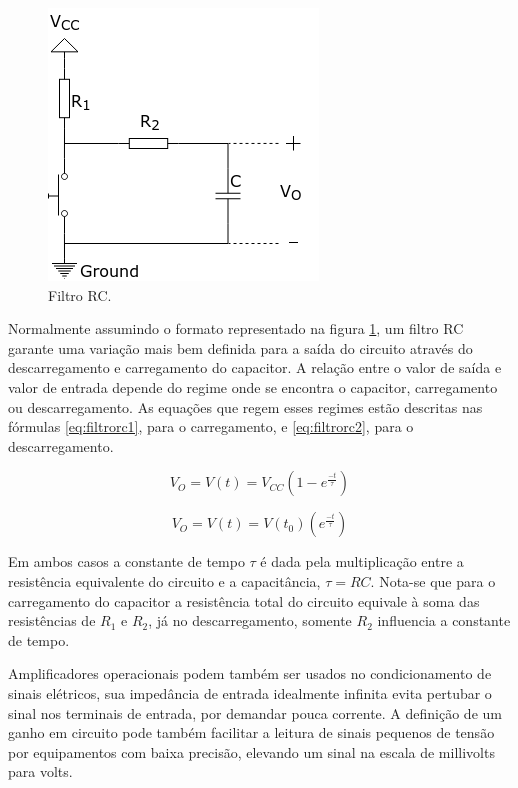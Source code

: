\begin{figure}[h]
    \caption{Filtro RC.}    
    
    \begin{centering}
        \includegraphics[width=0.3\columnwidth]{images/fundamentos/RCFilter.png}
    \par\end{centering}

    \label{fig:filtrorc}
\end{figure}

Normalmente assumindo o formato representado na figura \ref{fig:filtrorc},
um filtro RC garante uma variação mais bem definida para a saída do 
circuito através do descarregamento e carregamento do capacitor. 
A relação entre o valor de saída e valor de entrada depende do regime
onde se encontra o capacitor, carregamento ou descarregamento. 
As equações que regem esses regimes estão descritas nas fórmulas 
\ref{eq:filtrorc1}, para o carregamento, e \ref{eq:filtrorc2}, para o descarregamento.

\begin{equation}
    \label{eq:filtrorc1}
    V_O = V(t) = V_{CC}\left(1-e^{\frac{-t}{\tau}}\right)
\end{equation}

\begin{equation}
    \label{eq:filtrorc2}
    V_O = V(t) = V(t_0)\left(e^{\frac{-t}{\tau}}\right)
\end{equation}

Em ambos casos a constante de tempo $\tau$ é dada pela multiplicação 
entre a resistência equivalente do circuito e a capacitância, $\tau = RC$.
Nota-se que para o carregamento do capacitor a resistência total do
circuito equivale à soma das resistências de $R_1$ e $R_2$, já no 
descarregamento, somente $R_2$ influencia a constante de tempo. 

Amplificadores operacionais podem também ser usados no condicionamento
de sinais elétricos, sua impedância de entrada idealmente infinita 
evita pertubar o sinal nos terminais de entrada, por demandar pouca 
corrente.
A definição de um ganho em circuito pode também facilitar a leitura 
de sinais pequenos de tensão por equipamentos com baixa precisão, 
elevando um sinal na escala de millivolts para volts.

